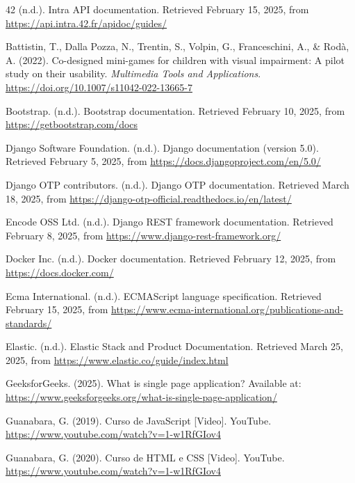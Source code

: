 
\begin{thebibliography}{99}

42 (n.d.). Intra API documentation. Retrieved February 15, 2025, from \url{https://api.intra.42.fr/apidoc/guides/}

Battistin, T., Dalla Pozza, N., Trentin, S., Volpin, G., Franceschini, A., \& Rodà, A. (2022). Co-designed mini-games for children with visual impairment: A pilot study on their usability. \textit{Multimedia Tools and Applications}. \url{https://doi.org/10.1007/s11042-022-13665-7}

Bootstrap. (n.d.). Bootstrap documentation. Retrieved February 10, 2025, from \url{https://getbootstrap.com/docs}

Django Software Foundation. (n.d.). Django documentation (version 5.0). Retrieved February 5, 2025, from \url{https://docs.djangoproject.com/en/5.0/}

Django OTP contributors. (n.d.). Django OTP documentation. Retrieved March 18, 2025, from \url{https://django-otp-official.readthedocs.io/en/latest/}

Encode OSS Ltd. (n.d.). Django REST framework documentation. Retrieved February 8, 2025, from \url{https://www.django-rest-framework.org/}

Docker Inc. (n.d.). Docker documentation. Retrieved February 12, 2025, from \url{https://docs.docker.com/}

Ecma International. (n.d.). ECMAScript language specification. Retrieved February 15, 2025, from \url{https://www.ecma-international.org/publications-and-standards/}

Elastic. (n.d.). Elastic Stack and Product Documentation. Retrieved March 25, 2025, from \url{https://www.elastic.co/guide/index.html}

GeeksforGeeks. (2025). What is single page application? Available at: \url{https://www.geeksforgeeks.org/what-is-single-page-application/}

Guanabara, G. (2019). Curso de JavaScript [Video]. YouTube. \url{https://www.youtube.com/watch?v=1-w1RfGIov4}

Guanabara, G. (2020). Curso de HTML e CSS [Video]. YouTube. \url{https://www.youtube.com/watch?v=1-w1RfGIov4}


\end{thebibliography}
